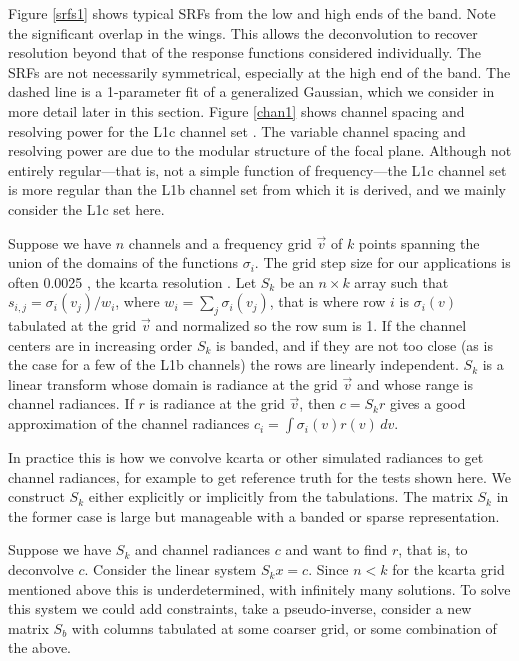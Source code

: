 \documentclass[11pt]{article}
\begin{document}
Figure \ref{srfs1} shows typical {\airs} SRFs from the low and high
ends of the band.  Note the significant overlap in the wings.  This
allows the deconvolution to recover resolution beyond that of the
response functions considered individually.  The SRFs are not
necessarily symmetrical, especially at the high end of the band.
The dashed line is a 1-parameter fit of a generalized Gaussian,
which we consider in more detail later in this section.  Figure
\ref{chan1} shows channel spacing and resolving power for the
{\airs} L1c channel set \cite{airs1c}.  The variable channel spacing
and resolving power are due to the modular structure of the focal
plane.  Although not entirely regular---that is, not a simple
function of frequency---the L1c channel set is more regular than the
L1b channel set from which it is derived, and we mainly consider the
L1c set here.

Suppose we have $n$ channels and a frequency grid $\vec v$ of $k$
points spanning the union of the domains of the functions
$\sigma_i$.  The grid step size for our applications is often 0.0025
{\wn}, the kcarta resolution \cite{kcarta1}.  Let $S_k$ be an
$n\times k$ array such that $s_{i,j} = \sigma_i(v_j)/w_i$, where
$w_i = \sum_j \sigma_i(v_j)$, that is where row $i$ is $\sigma_i(v)$
tabulated at the grid $\vec v$ and normalized so the row sum is 1.
If the channel centers are in increasing order $S_k$ is banded, and
if they are not too close (as is the case for a few of the L1b
channels) the rows are linearly independent.  $S_k$ is a linear
transform whose domain is radiance at the grid $\vec v$ and whose
range is channel radiances.  If $r$ is radiance at the grid $\vec
v$, then $c = S_k r$ gives a good approximation of the channel
radiances $c_i = \int\sigma_i(v)r(v)\,dv$.

In practice this is how we convolve kcarta or other simulated
radiances to get {\airs} channel radiances, for example to get
reference truth for the tests shown here.  We construct $S_k$ either
explicitly or implicitly from the {\airs} {\srf} tabulations.  The
matrix $S_k$ in the former case is large but manageable with a
banded or sparse representation.

Suppose we have $S_k$ and channel radiances $c$ and want to find
$r$, that is, to deconvolve $c$.  Consider the linear system $S_k x
= c$.  Since $n < k$ for the kcarta grid mentioned above this is
underdetermined, with infinitely many solutions.  To solve this
system we could add constraints, take a pseudo-inverse, consider a
new matrix $S_b$ with columns tabulated at some coarser grid, or
some combination of the above.
\end{document}
